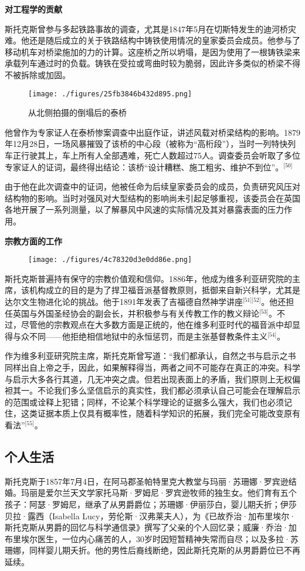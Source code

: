 \textbf{对工程学的贡献}

斯托克斯曾参与多起铁路事故的调查，尤其是1847年5月在切斯特发生的迪河桥灾难。他还是随后成立的关于铁路结构中铸铁使用情况的皇家委员会成员。他参与了移动机车对桥梁施加的力的计算。这座桥之所以坍塌，是因为使用了一根铸铁梁来承载列车通过时的负载。铸铁在受拉或弯曲时较为脆弱，因此许多类似的桥梁不得不被拆除或加固。
\begin{figure}[ht]
\centering
\texttt{[image: ./figures/25fb3846b432d895.png]}
\caption{从北侧拍摄的倒塌后的泰桥} \label{fig_QZstks_8}
\end{figure}
他曾作为专家证人在泰桥惨案调查中出庭作证，讲述风载对桥梁结构的影响。1879年12月28日，一场风暴摧毁了该桥的中心段（被称为“高桁段”），当时一列特快列车正行驶其上，车上所有人全部遇难，死亡人数超过75人。调查委员会听取了多位专家证人的证词，最终得出结论：该桥“设计糟糕、施工粗劣、维护不到位”。\(^\text{[50]}\)

由于他在此次调查中的证词，他被任命为后续皇家委员会的成员，负责研究风压对结构物的影响。当时对强风对大型结构的影响尚未引起足够重视，该委员会在英国各地开展了一系列测量，以了解暴风中风速的实际情况及其对暴露表面的压力作用。

\textbf{宗教方面的工作}

\begin{figure}[ht]
\centering
\texttt{[image: ./figures/4c78320d3e0dd86e.png]}
\caption{} \label{fig_QZstks_9}
\end{figure}
斯托克斯普遍持有保守的宗教价值观和信仰。1886年，他成为维多利亚研究院的主席，该机构成立的目的是为了捍卫福音派基督教原则，抵御来自新兴科学，尤其是达尔文生物进化论的挑战。他于1891年发表了吉福德自然神学讲座\(^\text{[51][52]}\)。他还担任英国与外国圣经协会的副会长，并积极参与有关传教工作的教义辩论\(^\text{[53]}\)。不过，尽管他的宗教观点在大多数方面是正统的，他在维多利亚时代的福音派中却显得与众不同——他拒绝相信地狱中的永恒惩罚，而是主张基督教条件主义\(^\text{[54]}\)。

作为维多利亚研究院主席，斯托克斯曾写道：“我们都承认，自然之书与启示之书同样出自上帝之手，因此，如果解释得当，两者之间不可能存在真正的冲突。科学与启示大多各行其道，几无冲突之虞。但若出现表面上的矛盾，我们原则上无权偏袒其一。不论我们多么坚信启示的真实性，我们都必须承认自己可能会在理解启示的范围或诠释上犯错；同样，不论某个科学理论的证据多么强大，我们也必须记住，这类证据本质上仅具有概率性，随着科学知识的拓展，我们完全可能改变原有看法”\(^\text{[55]}\)。
\subsection{个人生活}
斯托克斯于1857年7月4日，在阿马郡圣帕特里克大教堂与玛丽·苏珊娜·罗宾逊结婚。玛丽是爱尔兰天文学家托马斯·罗姆尼·罗宾逊牧师的独生女。他们育有五个孩子：阿瑟·罗姆尼，继承了从男爵爵位；苏珊娜·伊丽莎白，婴儿期夭折；伊莎贝拉·露西（Isabella Lucy，劳伦斯·汉弗莱夫人），为《已故乔治·加布里埃尔·斯托克斯从男爵的回忆与科学通信录》撰写了父亲的个人回忆录；威廉·乔治·加布里埃尔医生，一位内心痛苦的人，30岁时因短暂精神失常而自尽；以及多拉·苏珊娜，同样婴儿期夭折。他的男性后裔线断绝，因此斯托克斯的从男爵爵位已不再延续。

